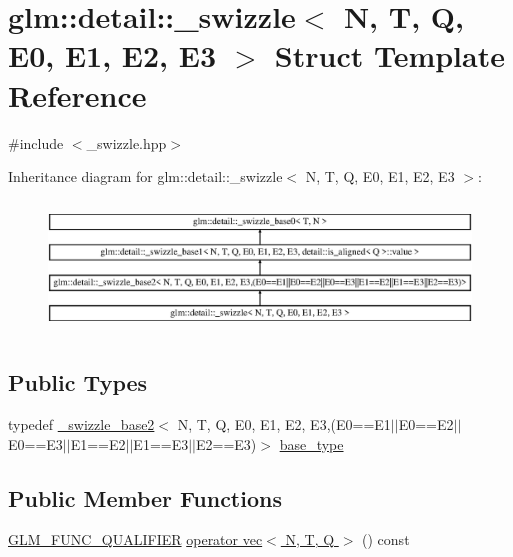 \hypertarget{structglm_1_1detail_1_1__swizzle}{}\section{glm\+:\+:detail\+:\+:\+\_\+swizzle$<$ N, T, Q, E0, E1, E2, E3 $>$ Struct Template Reference}
\label{structglm_1_1detail_1_1__swizzle}


{\ttfamily \#include $<$\+\_\+swizzle.\+hpp$>$}

Inheritance diagram for glm\+:\+:detail\+:\+:\+\_\+swizzle$<$ N, T, Q, E0, E1, E2, E3 $>$\+:\begin{figure}[H]
\begin{center}
\leavevmode
\includegraphics[height=3.533123cm]{structglm_1_1detail_1_1__swizzle}
\end{center}
\end{figure}
\subsection*{Public Types}
\begin{DoxyCompactItemize}
\item 
typedef \hyperlink{structglm_1_1detail_1_1__swizzle__base2}{\+\_\+swizzle\+\_\+base2}$<$ N, T, Q, E0, E1, E2, E3,(E0==E1$\vert$$\vert$E0==E2$\vert$$\vert$E0==E3$\vert$$\vert$E1==E2$\vert$$\vert$E1==E3$\vert$$\vert$E2==E3)$>$ \hyperlink{structglm_1_1detail_1_1__swizzle_ac055459bca5651cfea9466ffd3a0daeb}{base\+\_\+type}
\end{DoxyCompactItemize}
\subsection*{Public Member Functions}
\begin{DoxyCompactItemize}
\item 
\hyperlink{setup_8hpp_a33fdea6f91c5f834105f7415e2a64407}{G\+L\+M\+\_\+\+F\+U\+N\+C\+\_\+\+Q\+U\+A\+L\+I\+F\+I\+ER} \hyperlink{structglm_1_1detail_1_1__swizzle_ab4237b43cd0b0b081668ba6ab1072903}{operator vec$<$ N, T, Q $>$} () const
\end{DoxyCompactItemize}

